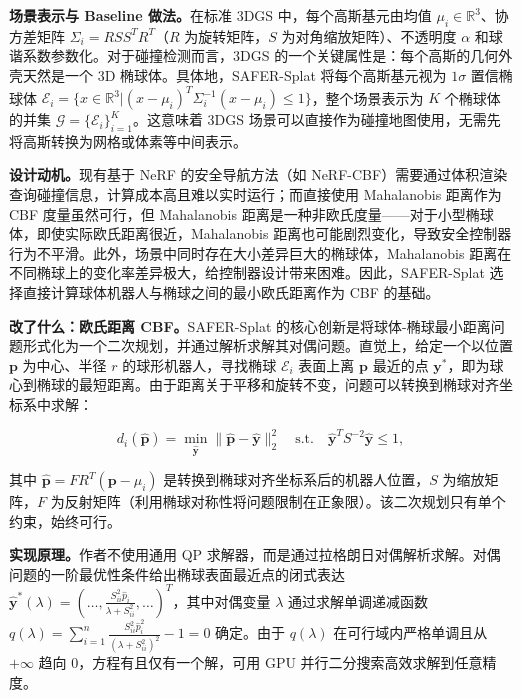 \textbf{场景表示与 Baseline 做法。}在标准 3DGS 中，每个高斯基元由均值 $\mu_i \in \mathbb{R}^3$、协方差矩阵 $\Sigma_i = R S S^T R^T$（$R$ 为旋转矩阵，$S$ 为对角缩放矩阵）、不透明度 $\alpha$ 和球谐系数参数化。对于碰撞检测而言，3DGS 的一个关键属性是：每个高斯的几何外壳天然是一个 3D 椭球体。具体地，SAFER-Splat 将每个高斯基元视为 $1\sigma$ 置信椭球体 $\mathcal{E}_i = \{x \in \mathbb{R}^3 | (x-\mu_i)^T \Sigma_i^{-1}(x-\mu_i) \leq 1\}$，整个场景表示为 $K$ 个椭球体的并集 $\mathcal{G} = \{\mathcal{E}_i\}_{i=1}^K$。这意味着 3DGS 场景可以直接作为碰撞地图使用，无需先将高斯转换为网格或体素等中间表示。

\textbf{设计动机。}现有基于 NeRF 的安全导航方法（如 NeRF-CBF）需要通过体积渲染查询碰撞信息，计算成本高且难以实时运行；而直接使用 Mahalanobis 距离作为 CBF 度量虽然可行，但 Mahalanobis 距离是一种非欧氏度量——对于小型椭球体，即使实际欧氏距离很近，Mahalanobis 距离也可能剧烈变化，导致安全控制器行为不平滑。此外，场景中同时存在大小差异巨大的椭球体，Mahalanobis 距离在不同椭球上的变化率差异极大，给控制器设计带来困难。因此，SAFER-Splat 选择直接计算球体机器人与椭球之间的最小欧氏距离作为 CBF 的基础。

\textbf{改了什么：欧氏距离 CBF。}SAFER-Splat 的核心创新是将球体-椭球最小距离问题形式化为一个二次规划，并通过解析求解其对偶问题。直觉上，给定一个以位置 $\mathbf{p}$ 为中心、半径 $r$ 的球形机器人，寻找椭球 $\mathcal{E}_i$ 表面上离 $\mathbf{p}$ 最近的点 $\mathbf{y}^*$，即为球心到椭球的最短距离。由于距离关于平移和旋转不变，问题可以转换到椭球对齐坐标系中求解：

\begin{equation}
    d_i(\hat{\mathbf{p}}) = \min_{\hat{\mathbf{y}}} \|\hat{\mathbf{p}} - \hat{\mathbf{y}}\|_2^2 \quad \text{s.t.} \quad \hat{\mathbf{y}}^T S^{-2} \hat{\mathbf{y}} \leq 1,
\end{equation}

其中 $\hat{\mathbf{p}} = FR^T(\mathbf{p} - \mu_i)$ 是转换到椭球对齐坐标系后的机器人位置，$S$ 为缩放矩阵，$F$ 为反射矩阵（利用椭球对称性将问题限制在正象限）。该二次规划只有单个约束，始终可行。

\textbf{实现原理。}作者不使用通用 QP 求解器，而是通过拉格朗日对偶解析求解。对偶问题的一阶最优性条件给出椭球表面最近点的闭式表达 $\hat{\mathbf{y}}^*(\lambda) = \left(\ldots, \frac{S_{ii}^2 \hat{p}_i}{\lambda + S_{ii}^2}, \ldots\right)^T$，其中对偶变量 $\lambda$ 通过求解单调递减函数 $q(\lambda) = \sum_{i=1}^n \frac{S_{ii}^2 \hat{p}_i^2}{(\lambda + S_{ii}^2)^2} - 1 = 0$ 确定。由于 $q(\lambda)$ 在可行域内严格单调且从 $+\infty$ 趋向 0，方程有且仅有一个解，可用 GPU 并行二分搜索高效求解到任意精度。

